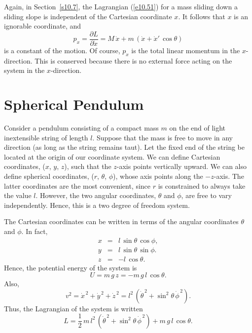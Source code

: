 Again, in Section~\ref{s10.7}, the Lagrangian (\ref{e10.51}) for a mass
sliding down a sliding slope is independent
of the Cartesian coordinate $x$. It follows that $x$ is an ignorable coordinate,
and
\begin{equation}
p_x = \frac{\partial L}{\partial \dot{x}} = M\,\dot{x} + m\,(\dot{x}+\dot{x}'\,\cos\theta)
\end{equation}
is a constant of the motion. Of course, $p_x$ is the total linear momentum in the $x$-direction. This is conserved because there is no external force acting on
the system in the $x$-direction.

\section{Spherical Pendulum}
Consider a pendulum consisting of a  compact mass $m$ on the end of light
inextensible string of length $l$. Suppose that the mass is free to move
in any direction (as long as the string remains taut). Let the
fixed end of the string be located at the origin of our coordinate system. 
We can define Cartesian coordinates, ($x$, $y$, $z$), such that
the $z$-axis points vertically upward. We can also define spherical
 coordinates, ($r$, $\theta$, $\phi$), whose axis points along the $-z$-axis. The latter coordinates are the most convenient, since $r$ is constrained to always take the value $l$. However, the two angular coordinates,
$\theta$ and $\phi$, are free to vary independently. Hence, this is
 a two degree of freedom system. 

The Cartesian coordinates can be written in terms of the angular coordinates
$\theta$ and $\phi$. In fact, 
\begin{eqnarray}
x &=& l\,\sin\theta\,\cos\phi,\\[0.5ex]
y&=& l\,\sin\theta\,\sin\phi.\\[0.5ex]
z &=& -l\,\cos\theta.
\end{eqnarray}
Hence, the potential energy of the system is
\begin{equation}
U = m\,g\,z= - m\,g\,l\,\cos\theta.
\end{equation}
Also,
\begin{equation}
v^2 = \dot{x}^{\,2} + \dot{y}^{\,2} + \dot{z}^{\,2} = l^2\,(\dot{\theta}^{\,2}+ \sin^2\theta\,\dot{\phi}^{\,2}).
\end{equation}
Thus, the Lagrangian of the system is written
\begin{equation}
L = \frac{1}{2}\,m\,l^2\,(\dot{\theta}^{\,2}+ \sin^2\theta\,\dot{\phi}^{\,2})
+ m\,g\,l\,\cos\theta.
\end{equation}

